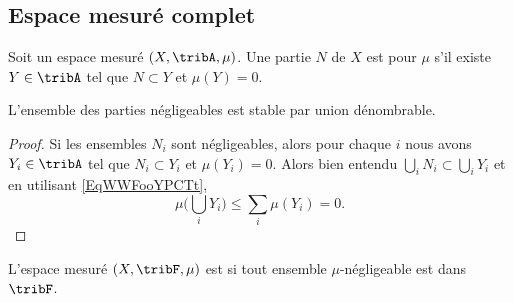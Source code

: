 \subsection{Espace mesuré complet}

\begin{definition}  \label{DefAVDoomkuXi}
    Soit un espace mesuré \( (X,\tribA,\mu)\). Une partie \( N\) de \( X\) est  pour \( \mu\) s'il existe \( Y\in\tribA\) tel que \( N\subset Y\) et \( \mu(Y)=0\).
\end{definition}

\begin{lemma}   \label{LemVKNooOCOQw}
    L'ensemble des parties négligeables est stable par union dénombrable.
\end{lemma}

\begin{proof}
    Si les ensembles \( N_i\) sont négligeables, alors pour chaque \( i\) nous avons \( Y_i\in\tribA\) tel que \( N_i\subset Y_i\) et \( \mu(Y_i)=0\). Alors bien entendu \( \bigcup_iN_i\subset \bigcup_iY_i\) et en utilisant \eqref{EqWWFooYPCTt},
    \begin{equation}
        \mu\big( \bigcup_iY_i \big)\leq \sum_i\mu(Y_i)=0.
    \end{equation}
\end{proof}

\begin{definition}  \label{DefBWAoomQZcI}
    L'espace mesuré \( (X,\tribF,\mu)\) est  si tout ensemble \( \mu\)-négligeable est dans \( \tribF\).
\end{definition}

